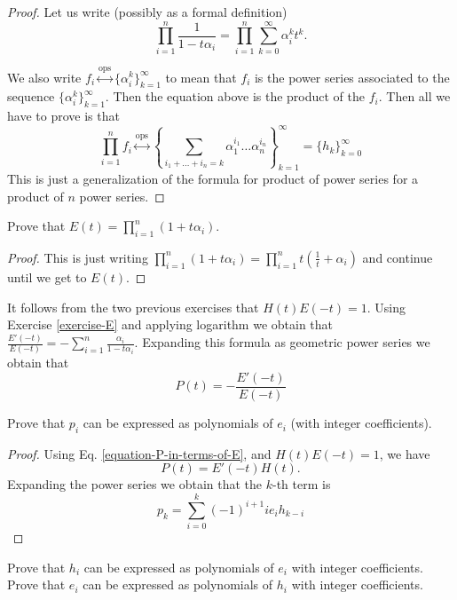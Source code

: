 \begin{proof}
Let us write (possibly as a formal definition)
$$
\prod_{i=1}^n\frac{1}{1-t\alpha_i}=\prod_{i=1}^n\sum_{k=0}^\infty\alpha_i^kt^k.
$$

We also write 
$f_i\overset{\text{ops}}{\longleftrightarrow}\{\alpha_i^k\}_{k=1}^\infty$ to mean
that $f_i$ is the power series associated to the sequence
$\{\alpha_i^k\}_{k=1}^\infty$. Then the equation above is the product of the
$f_i$. Then all we have to prove is that
$$
\prod_{i=1}^nf_i\overset{\text{ops}}{\longleftrightarrow}
\left\{\sum_{i_1+\ldots+i_n=k}\alpha_1^{i_1}\ldots\alpha_n^{i_n}\right\}
_{k=1}^\infty=\{h_k\}_{k=0}^\infty
$$
This is just a generalization of the formula for product of power series for a
product of $n$ power series.
\end{proof}

\begin{exercise}
\label{exercise-E}
Prove that $E(t)=\prod_{i=1}^n(1+t\alpha_i)$.
\end{exercise}

\begin{proof}
This is just writing $\prod_{i=1}^n(1+t\alpha_i)
=\prod_{i=1}^nt(\frac{1}{t}+\alpha_i)$ and continue until we get to $E(t)$.
\end{proof}

\noindent
It follows from the two previous exercises that $H(t)E(-t)=1$. Using Exercise
\ref{exercise-E} and applying logarithm we obtain that
$\frac{E'(-t)}{E(-t)}=-\sum_{i=1}^n \frac{\alpha_i}{1-t\alpha_i}$. Expanding
this formula as geometric power series we obtain that 
\begin{equation}
\label{equation-P-in-terms-of-E}
P(t)=-\frac{E'(-t)}{E(-t)}
\end{equation}

\begin{exercise}
\label{exercise-p-polynomials-of-e}
Prove that $p_i$ can be expressed as polynomials of $e_i$ (with integer
coefficients).
\end{exercise}

\begin{proof}
Using Eq. \ref{equation-P-in-terms-of-E}, and $H(t)E(-t)=1$, we have
$$
P(t)=E'(-t)H(t).
$$
Expanding the power series we obtain that the $k$-th term is
$$
p_k=\sum_{i=0}^k(-1)^{i+1}ie_ih_{k-i}
$$
\end{proof}

\begin{exercise}
\label{exercise-h-and-e}
Prove that $h_i$ can be expressed as polynomials of $e_i$ with integer
coefficients. Prove that $e_i$ can be expressed as polynomials of $h_i$ with
integer coefficients.
\end{exercise}


